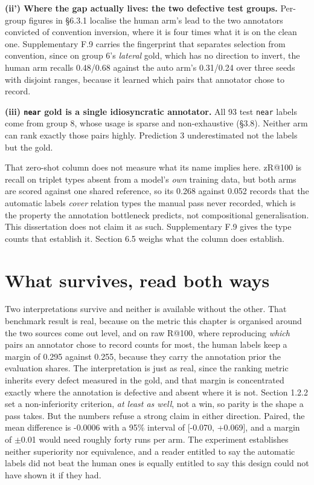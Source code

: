 \textbf{(ii') Where the gap actually lives: the two defective test groups.} Per-group figures in \S{}6.3.1 localise the human arm's lead to the two annotators convicted of convention inversion, where it is four times what it is on the clean one. Supplementary F.9 carries the fingerprint that separates selection from convention, since on group 6's \textit{lateral} gold, which has no direction to invert, the human arm recalls 0.48/0.68 against the auto arm's 0.31/0.24 over three seeds with disjoint ranges, because it learned which pairs that annotator chose to record.

\textbf{(iii) \texttt{near} gold is a single idiosyncratic annotator.} All 93 test \texttt{near} labels come from group 8, whose usage is sparse and non-exhaustive (\S{}3.8). Neither arm can rank exactly those pairs highly. Prediction 3 underestimated not the labels but the gold.

That zero-shot column does not measure what its name implies here. zR@100 is recall on triplet types absent from a model's \textit{own} training data, but both arms are scored against one shared reference, so its 0.268 against 0.052 records that the automatic labels \textit{cover} relation types the manual pass never recorded, which is the property the annotation bottleneck predicts, not compositional generalisation. This dissertation does not claim it as such. Supplementary F.9 gives the type counts that establish it. Section 6.5 weighs what the column does establish.

\section{What survives, read both ways}

Two interpretations survive and neither is available without the other. That benchmark result is real, because on the metric this chapter is organised around the two sources come out level, and on raw R@100, where reproducing \textit{which} pairs an annotator chose to record counts for most, the human labels keep a margin of 0.295 against 0.255, because they carry the annotation prior the evaluation shares. The interpretation is just as real, since the ranking metric inherits every defect measured in the gold, and that margin is concentrated exactly where the annotation is defective and absent where it is not. Section 1.2.2 set a non-inferiority criterion, \textit{at least as well}, not a win, so parity is the shape a pass takes. But the numbers refuse a strong claim in either direction. Paired, the mean difference is -0.0006 with a 95\% interval of [-0.070, +0.069], and a margin of $\pm$0.01 would need roughly forty runs per arm. The experiment establishes neither superiority nor equivalence, and a reader entitled to say the automatic labels did not beat the human ones is equally entitled to say this design could not have shown it if they had.

